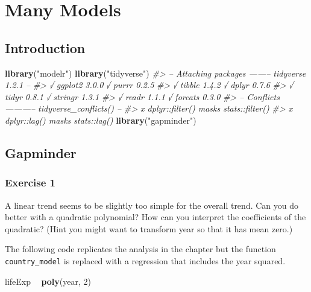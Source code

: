 \documentclass[]{book}
\newenvironment{Shaded}{\begin{snugshade}}{\end{snugshade}}
\newcommand{\CommentTok}[1]{\textcolor[rgb]{0.56,0.35,0.01}{\textit{#1}}}
\newcommand{\DecValTok}[1]{\textcolor[rgb]{0.00,0.00,0.81}{#1}}
\newcommand{\KeywordTok}[1]{\textcolor[rgb]{0.13,0.29,0.53}{\textbf{#1}}}
\newcommand{\NormalTok}[1]{#1}
\newcommand{\OperatorTok}[1]{\textcolor[rgb]{0.81,0.36,0.00}{\textbf{#1}}}
\newcommand{\StringTok}[1]{\textcolor[rgb]{0.31,0.60,0.02}{#1}}
\theoremstyle{plain}
\theoremstyle{remark}
\theoremstyle{definition}
\theoremstyle{definition}
\theoremstyle{definition}
\theoremstyle{remark}
\begin{document}
\hypertarget{many-models}{%
\chapter{Many Models}\label{many-models}}

\hypertarget{introduction-16}{%
\section{Introduction}\label{introduction-16}}

\begin{Shaded}
\begin{Highlighting}[]
\KeywordTok{library}\NormalTok{(}\StringTok{"modelr"}\NormalTok{)}
\KeywordTok{library}\NormalTok{(}\StringTok{"tidyverse"}\NormalTok{)}
\CommentTok{#> -- Attaching packages -------- tidyverse 1.2.1 --}
\CommentTok{#> √ ggplot2 3.0.0     √ purrr   0.2.5}
\CommentTok{#> √ tibble  1.4.2     √ dplyr   0.7.6}
\CommentTok{#> √ tidyr   0.8.1     √ stringr 1.3.1}
\CommentTok{#> √ readr   1.1.1     √ forcats 0.3.0}
\CommentTok{#> -- Conflicts ----------- tidyverse_conflicts() --}
\CommentTok{#> x dplyr::filter() masks stats::filter()}
\CommentTok{#> x dplyr::lag()    masks stats::lag()}
\KeywordTok{library}\NormalTok{(}\StringTok{"gapminder"}\NormalTok{)}
\end{Highlighting}
\end{Shaded}

\hypertarget{gapminder}{%
\section{Gapminder}\label{gapminder}}

\hypertarget{exercise-1-67}{%
\subsection{Exercise 1}\label{exercise-1-67}}

A linear trend seems to be slightly too simple for the overall trend.
Can you do better with a quadratic polynomial? How can you interpret the
coefficients of the quadratic? (Hint you might want to transform year so
that it has mean zero.)

The following code replicates the analysis in the chapter but the
function \texttt{country\_model} is replaced with a regression that
includes the year squared.

\begin{Shaded}
\begin{Highlighting}[]
\NormalTok{lifeExp }\OperatorTok{~}\StringTok{ }\KeywordTok{poly}\NormalTok{(year, }\DecValTok{2}\NormalTok{)}
\end{Highlighting}
\end{Shaded}
\end{document}
